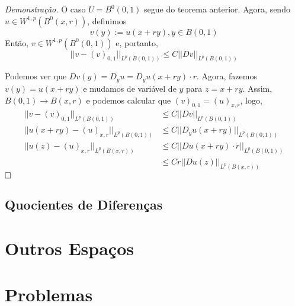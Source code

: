 \documentclass[11pt]{article}
\newcommand{\qed}{$\hfill\square$}
\begin{document}
\textit{Demonstração.} O caso $U=B^0(0,1)$ segue do teorema anterior. Agora, sendo $u  \in W^{1,p}(B^0(x,r)) $, definimos \[v(y):=u(x+ry), y \in B(0,1)\] Então, $v \in W^{1,p}(B^0(0,1))$ e, portanto, \[ || v - (v)_{0,1}||_{L^p(B(0,1))} \leq C ||Dv||_{L^p(B(0,1))}\]

Podemos ver que $Dv(y) = D_yu = D_yu(x+ry)\cdot r$. Agora, fazemos $v(y)=u(x+ry)$ e mudamos de variável de $y$ para $z=x+ry$. Assim, $B(0,1) \rightarrow B(x,r)$ e podemos calcular que $(v)_{0,1}=(u)_{x,r}$, logo,
\begin{align*}
	|| v - (v)_{0,1}||_{L^p(B(0,1))} &\leq C ||Dv||_{L^p(B(0,1))} \\
	|| u(x+ry) - (u)_{x,r}||_{L^p(B(0,1))} &\leq C ||D_y u(x+ry)||_{L^p(B(0,1))} \\
	|| u(z) - (u)_{x,r}||_{L^p(B(x,r))} &\leq C ||Du(x+ry)\cdot r||_{L^p(B(0,1))} \\
	&\leq C r ||Du(z)||_{L^p(B(x,r))}
\end{align*}\qed








\subsection{Quocientes de Diferenças}















\section{Outros Espaços}

\section{Problemas}
\end{document}
